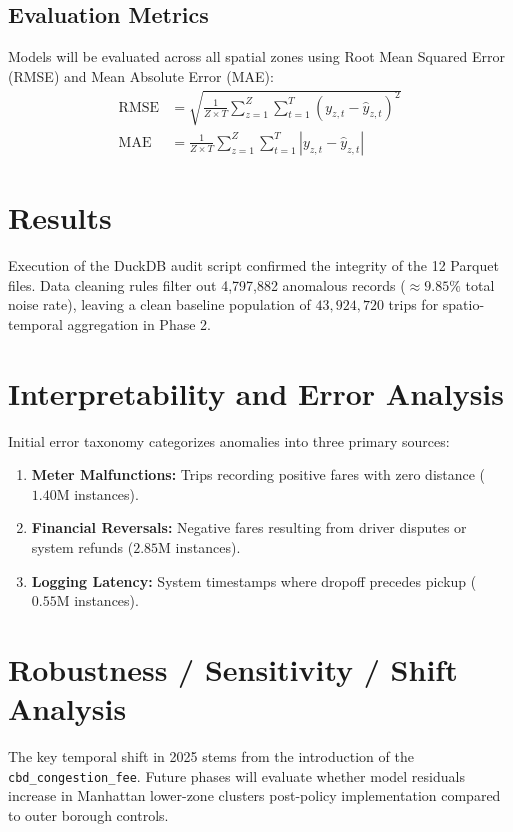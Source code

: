 \documentclass[11pt,a4paper]{article}
\begin{document}
\subsection{Evaluation Metrics}
Models will be evaluated across all spatial zones using Root Mean Squared Error (RMSE) and Mean Absolute Error (MAE):
\begin{align}
\text{RMSE} &= \sqrt{\frac{1}{Z \times T} \sum_{z=1}^{Z} \sum_{t=1}^{T} \left( y_{z,t} - \hat{y}_{z,t} \right)^2} \\
\text{MAE} &= \frac{1}{Z \times T} \sum_{z=1}^{Z} \sum_{t=1}^{T} \left| y_{z,t} - \hat{y}_{z,t} \right|
\end{align}

\section{Results}
Execution of the DuckDB audit script confirmed the integrity of the 12 Parquet files. Data cleaning rules filter out 4,797,882 anomalous records ($\approx 9.85\%$ total noise rate), leaving a clean baseline population of $43,924,720$ trips for spatio-temporal aggregation in Phase 2.

\section{Interpretability and Error Analysis}
Initial error taxonomy categorizes anomalies into three primary sources:
\begin{enumerate}
    \item \textbf{Meter Malfunctions:} Trips recording positive fares with zero distance ($1.40\text{M}$ instances).
    \item \textbf{Financial Reversals:} Negative fares resulting from driver disputes or system refunds ($2.85\text{M}$ instances).
    \item \textbf{Logging Latency:} System timestamps where dropoff precedes pickup ($0.55\text{M}$ instances).
\end{enumerate}

\section{Robustness / Sensitivity / Shift Analysis}
The key temporal shift in 2025 stems from the introduction of the \texttt{cbd\_congestion\_fee}. Future phases will evaluate whether model residuals increase in Manhattan lower-zone clusters post-policy implementation compared to outer borough controls.
\end{document}
